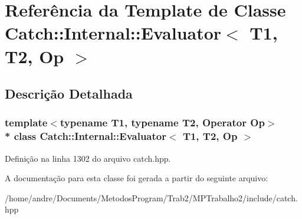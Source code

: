 \hypertarget{classCatch_1_1Internal_1_1Evaluator}{}\section{Referência da Template de Classe Catch\+:\+:Internal\+:\+:Evaluator$<$ T1, T2, Op $>$}
\label{classCatch_1_1Internal_1_1Evaluator}


\subsection{Descrição Detalhada}
\subsubsection*{template$<$typename T1, typename T2, Operator Op$>$\\*
class Catch\+::\+Internal\+::\+Evaluator$<$ T1, T2, Op $>$}



Definição na linha 1302 do arquivo catch.\+hpp.



A documentação para esta classe foi gerada a partir do seguinte arquivo\+:\begin{DoxyCompactItemize}
\item 
/home/andre/\+Documents/\+Metodos\+Program/\+Trab2/\+M\+P\+Trabalho2/include/catch.\+hpp\end{DoxyCompactItemize}
